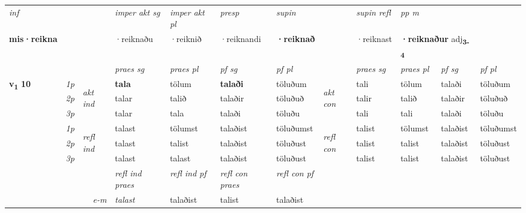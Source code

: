 \begin{longtable}[l]{X>{\footnotesize\itshape}llXXXXlXXXX}
\cmidrule{4-7}
   {\textit{inf}} & &  & \textit{imper akt sg} & \textit{imper akt pl}   & \textit{presp} & \textit{supin} && \textit{supin refl} & \textit{pp m} \\*
  {\textbf{mis\allowbreak ·reikna}} & && ·reiknaðu  & ·reiknið   & ·reiknandi &  \textbf{·reiknað} && ·reiknast & \multicolumn{2}{l}{\textbf{·reiknaður} adj\textbf{\textsubscript{3-4}}} \\*

\midrule

 & &   & \textit{praes sg}  & \textit{praes pl}    & \textit{ pf sg} & \textit{pf pl} & & \textit{praes sg}  & \textit{praes pl}    & \textit{pf sg} & \textit{pf pl }  \\ \cmidrule{4-7} \cmidrule{9-12}
 \multirow{2}{*}{{{\textbf{v{\textsubscript{1}}} \Large{\textbf{10}}}}}  & 1p & \multirow{3}{*}{\begin{turn}{90}\textit{akt ind}\end{turn}} & \textbf{tala} & tölum & \textbf{talaði} & töluðum & \multirow{3}{*}{\begin{turn}{90}\textit{akt con}\end{turn}} &tali & tölum & talaði & töluðum\\*
 & 2p &  &  talar  & talið & talaðir & töluðuð & & talir & talið & talaðir & töluðuð \\*
 & 3p &  & talar & tala & talaði & töluðu & & tali & tali& talaði & töluðu \\*
\cmidrule{4-7} \cmidrule{9-12}
 & 1p & \multirow{3}{*}{\begin{turn}{90}\textit{refl ind}\end{turn}}  & talast & tölumst & talaðist & töluðumst & \multirow{3}{*}{\begin{turn}{90}\textit{refl con}\end{turn}}  &talist & tölumst & talaðist & töluðumst \\*
 & 2p &  & talast & talist & talaðist & töluðust & &talist & talist & talaðist & töluðust \\*
 & 3p  & & talast & talast & talaðist & töluðust & & talist & talist& talaðist & töluðust \\*
\cmidrule{4-7} \cmidrule{9-12}

 & && \textit{refl ind praes} & \textit{refl ind pf} & \textit{refl con praes} & \textit{refl con pf} \\*
\multicolumn{3}{r}{\textit{e-m}}& talast & talaðist & talist & talaðist \\*


\end{longtable}
